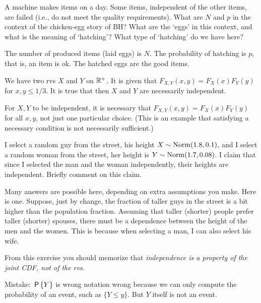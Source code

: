 \begin{exercise}
A machine makes items on a day.
Some items, independent of the other items, are failed (i.e., do not meet the quality requirements).
What are $N$ and  $p$ in the context of the chicken-egg story of BH? What are the `eggs' in this context, and what is the meaning of `hatching'?
What type of `hatching' do we have here?
\begin{solution}
  The number of produced items (laid eggs) is $N$. The probability of hatching is $p$, that is, an item is ok. The hatched eggs are the good items.
\end{solution}
\end{exercise}



\begin{exercise}
We have two rvs $X$ and $Y$ on $\R^{+}$. It is given that $F_{X,Y}(x,y) = F_X(x)F_Y(y)$ for $x,y \leq 1/3$. It is true that then  $X$ and $Y$ are necessarily independent.
\begin{solution}
For $X, Y$ to be independent, it is necessary that  $F_{X,Y}(x,y) = F_X(x)F_Y(y)$ for all $x,y$, not just one particular choice. (This is an example that satisfying a necessary condition is not necessarily sufficient.)
\end{solution}
\end{exercise}

\begin{exercise}
I select a random guy from the street, his height $X\sim\Norm{1.8, 0.1}$, and I select a random woman from the street, her height is $Y\sim\Norm{1.7, 0.08}$.
I claim that since I selected the man and the woman independently, their heights are independent.
Briefly comment on this claim.


\begin{solution}
  Many answers are possible here, depending on extra assumptions you make.
  Here is one.
  Suppose, just by change, the fraction of taller guys in the street is a bit higher than the population fraction.
  Assuming that taller (shorter) people prefer taller (shorter) spouses, there must be a dependence between the height of the men and the women. This is because when selecting a man, I can also select his wife.

From this exercise you should memorize that \emph{independence is a property of the joint CDF, not of the rvs}.

Mistake:   $\P{Y}$ is wrong notation wrong because we can only compute the probability of an event, such as $\{Y\leq y\}$. But $Y$ itself is not an event. \end{solution}
\end{exercise}


